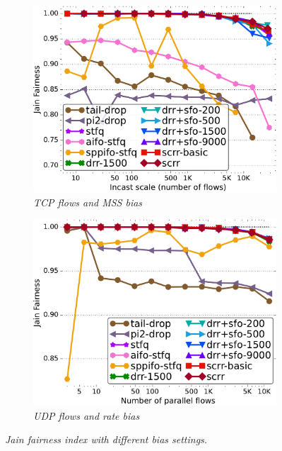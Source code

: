 \begin{figure}[t]
  \centering
\begin{subfigure}[t]{.49\linewidth}
		\centering
      \includegraphics[width=0.95\linewidth]{figs/paral_cn_6t4x1024_mss_2500_jain_comp_methods.pdf}
    \caption{\small{\textit{TCP flows and MSS bias}}}
	\label{fig:fairness-tcp-mss}
\end{subfigure}
\begin{subfigure}[t]{.49\linewidth}
		\centering
      \includegraphics[width=0.95\linewidth]{figs/pal_cn_3u4x1024_Cb_25G_fl_0_tgt_15.pdf}
    \caption{\small{\textit{UDP flows and rate bias}}}
	\label{fig:fairness-udp-25g}
\end{subfigure}
 \vspace{-3mm}
    \caption{\small{\textit{Jain fairness index with different bias settings.}}}
    \label{fig:fairness}
    \vspace{-5mm}
\end{figure}

